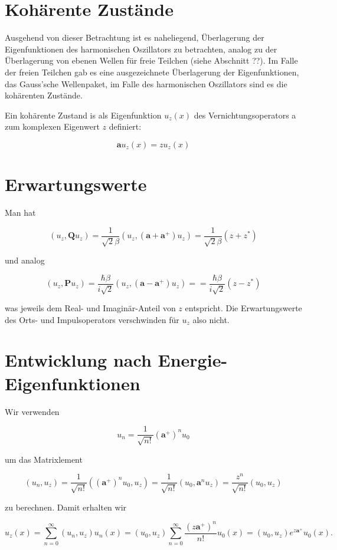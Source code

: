 \documentclass[10pt, letterpaper]{article}
\begin{document}
\section*{Kohärente Zustände}
Ausgehend von dieser Betrachtung ist es naheliegend, Überlagerung der Eigenfunktionen des harmonischen Oszillators zu betrachten, analog zu der Überlagerung von ebenen Wellen für freie Teilchen (siehe Abschnitt ??). Im Falle der freien Teilchen gab es eine ausgezeichnete Überlagerung der Eigenfunktionen, das Gauss'sche Wellenpaket, im Falle des harmonischen Oszillators sind es die kohärenten Zustände.

Ein kohärente Zustand is als Eigenfunktion $u_{z}(x)$ des Vernichtungsoperators a zum komplexen Eigenwert $z$ definiert:

$$
\mathbf{a} u_{z}(x)=z u_{z}(x)
$$

\section*{Erwartungswerte}
Man hat

$$
\left(u_{z}, \mathbf{Q} u_{z}\right)=\frac{1}{\sqrt{2} \beta}\left(u_{z},\left(\mathbf{a}+\mathbf{a}^{+}\right) u_{z}\right)=\frac{1}{\sqrt{2} \beta}\left(z+z^{*}\right)
$$

und analog

$$
\left(u_{z}, \mathbf{P} u_{z}\right)=\frac{\hbar \beta}{i \sqrt{2}}\left(u_{z},\left(\mathbf{a}-\mathbf{a}^{+}\right) u_{z}\right)==\frac{\hbar \beta}{i \sqrt{2}}\left(z-z^{*}\right)
$$

was jeweils dem Real- und Imaginär-Anteil von $z$ entspricht. Die Erwartungswerte des Orts- und Impulsoperators verschwinden für $u_{z}$ also nicht.

\section*{Entwicklung nach Energie-Eigenfunktionen}
Wir verwenden

$$
u_{n}=\frac{1}{\sqrt{n!}}\left(\mathbf{a}^{+}\right)^{n} u_{0}
$$

um das Matrixlement

$$
\left(u_{n}, u_{z}\right)=\frac{1}{\sqrt{n!}}\left(\left(\mathbf{a}^{+}\right)^{n} u_{0}, u_{z}\right)=\frac{1}{\sqrt{n!}}\left(u_{0}, \mathbf{a}^{n} u_{z}\right)=\frac{z^{n}}{\sqrt{n!}}\left(u_{0}, u_{z}\right)
$$

zu berechnen. Damit erhalten wir

$$
u_{z}(x)=\sum_{n=0}^{\infty}\left(u_{n}, u_{z}\right) u_{n}(x)=\left(u_{0}, u_{z}\right) \sum_{n=0}^{\infty} \frac{\left(z \mathbf{a}^{+}\right)^{n}}{n!} u_{0}(x)=\left(u_{0}, u_{z}\right) e^{z \mathbf{a}^{+}} u_{0}(x) .
$$
\end{document}
